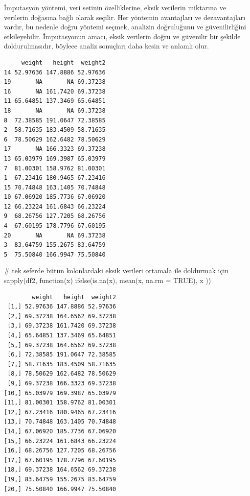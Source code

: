 \documentclass[
  letterpaper,
  DIV=11,
  numbers=noendperiod]{scrreprt}
\newenvironment{Shaded}{\begin{snugshade}}{\end{snugshade}}
\newcommand{\AttributeTok}[1]{\textcolor[rgb]{0.40,0.45,0.13}{#1}}
\newcommand{\CommentTok}[1]{\textcolor[rgb]{0.37,0.37,0.37}{#1}}
\newcommand{\ConstantTok}[1]{\textcolor[rgb]{0.56,0.35,0.01}{#1}}
\newcommand{\ControlFlowTok}[1]{\textcolor[rgb]{0.00,0.23,0.31}{#1}}
\newcommand{\FunctionTok}[1]{\textcolor[rgb]{0.28,0.35,0.67}{#1}}
\newcommand{\NormalTok}[1]{\textcolor[rgb]{0.00,0.23,0.31}{#1}}
\newcommand{\OtherTok}[1]{\textcolor[rgb]{0.00,0.23,0.31}{#1}}
\newcommand{\SpecialCharTok}[1]{\textcolor[rgb]{0.37,0.37,0.37}{#1}}
\begin{document}
İmputasyon yöntemi, veri setinin özelliklerine, eksik verilerin
miktarına ve verilerin doğasına bağlı olarak seçilir. Her yöntemin
avantajları ve dezavantajları vardır, bu nedenle doğru yöntemi seçmek,
analizin doğruluğunu ve güvenilirliğini etkileyebilir. İmputasyonun
amacı, eksik verilerin doğru ve güvenilir bir şekilde doldurulmasıdır,
böylece analiz sonuçları daha kesin ve anlamlı olur.

\begin{Shaded}
\end{Shaded}

\begin{verbatim}
     weight   height  weight2
14 52.97636 147.8886 52.97636
19       NA       NA 69.37238
16       NA 161.7420 69.37238
11 65.64851 137.3469 65.64851
18       NA       NA 69.37238
8  72.38585 191.0647 72.38585
2  58.71635 183.4509 58.71635
6  78.50629 162.6482 78.50629
17       NA 166.3323 69.37238
13 65.03979 169.3987 65.03979
7  81.00301 158.9762 81.00301
1  67.23416 180.9465 67.23416
15 70.74848 163.1405 70.74848
10 67.06920 185.7736 67.06920
12 66.23224 161.6843 66.23224
9  68.26756 127.7205 68.26756
4  67.60195 178.7796 67.60195
20       NA       NA 69.37238
3  83.64759 155.2675 83.64759
5  75.50840 166.9947 75.50840
\end{verbatim}

\begin{Shaded}
\begin{Highlighting}[]
\CommentTok{\# tek seferde bütün kolonlardaki eksik verileri ortamala ile doldurmak için}
\FunctionTok{sapply}\NormalTok{(df2, }\ControlFlowTok{function}\NormalTok{(x) }\FunctionTok{ifelse}\NormalTok{(}\FunctionTok{is.na}\NormalTok{(x), }\FunctionTok{mean}\NormalTok{(x, }\AttributeTok{na.rm =} \ConstantTok{TRUE}\NormalTok{), x ))}
\end{Highlighting}
\end{Shaded}

\begin{verbatim}
        weight   height  weight2
 [1,] 52.97636 147.8886 52.97636
 [2,] 69.37238 164.6562 69.37238
 [3,] 69.37238 161.7420 69.37238
 [4,] 65.64851 137.3469 65.64851
 [5,] 69.37238 164.6562 69.37238
 [6,] 72.38585 191.0647 72.38585
 [7,] 58.71635 183.4509 58.71635
 [8,] 78.50629 162.6482 78.50629
 [9,] 69.37238 166.3323 69.37238
[10,] 65.03979 169.3987 65.03979
[11,] 81.00301 158.9762 81.00301
[12,] 67.23416 180.9465 67.23416
[13,] 70.74848 163.1405 70.74848
[14,] 67.06920 185.7736 67.06920
[15,] 66.23224 161.6843 66.23224
[16,] 68.26756 127.7205 68.26756
[17,] 67.60195 178.7796 67.60195
[18,] 69.37238 164.6562 69.37238
[19,] 83.64759 155.2675 83.64759
[20,] 75.50840 166.9947 75.50840
\end{verbatim}
\end{document}
